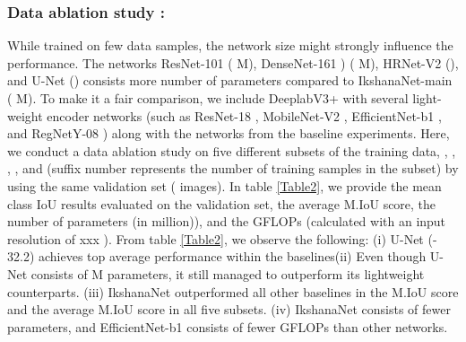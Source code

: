 \documentclass{article}
\begin{document}
\subsubsection{Data ablation study :}
\label{4.2.2}
While trained on few data samples, the network size might strongly influence the performance. The networks ResNet-101 \cite{he2016deep} ( M), DenseNet-161 \cite{huang2017densely}) ( M), HRNet-V2 \cite{SunZJCXLMWLW19} (), and U-Net \cite{ronneberger2015u} () consists more number of parameters compared to IkshanaNet-main ( M). To make it a fair comparison, we include DeeplabV3+ \cite{chen2018encoder} with several light-weight encoder networks (such as ResNet-18 \cite{he2016deep}, MobileNet-V2 \cite{mobileNetV2}, EfficientNet-b1 \cite{TanL19}, and RegNetY-08 \cite{RegNet}) along with the networks from the baseline experiments.\newline
Here, we conduct a data ablation study on five different subsets of the training data, , , , , and  (suffix number represents the number of training samples in the subset)  by using the same validation set ( images). \newline
In table \ref{Table2}, we provide the mean class IoU results evaluated on the validation set,  the average M.IoU score, the number of parameters (in million)), and the GFLOPs \cite{GFLOPS} (calculated with an input resolution of xxx ). \newline
From table \ref{Table2}, we observe the following: \newline
(i) U-Net \cite{ronneberger2015u} (- 32.2) achieves top average performance within the baselines\newline (ii) Even though U-Net \cite{ronneberger2015u} consists of M parameters, it still managed to outperform its lightweight counterparts.\newline
(iii) IkshanaNet outperformed all other baselines in the M.IoU score and the average M.IoU score in all five subsets.\newline
(iv) IkshanaNet consists of fewer parameters, and EfficientNet-b1 \cite{TanL19} consists of fewer GFLOPs than other networks. 
\end{document}
